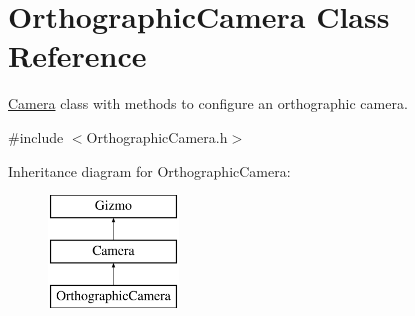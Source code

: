 \hypertarget{class_orthographic_camera}{\section{Orthographic\+Camera Class Reference}
\label{class_orthographic_camera}
}


\hyperlink{class_camera}{Camera} class with methods to configure an orthographic camera.  




{\ttfamily \#include $<$Orthographic\+Camera.\+h$>$}

Inheritance diagram for Orthographic\+Camera\+:\begin{figure}[H]
\begin{center}
\leavevmode
\includegraphics[height=3.000000cm]{class_orthographic_camera}
\end{center}
\end{figure}
